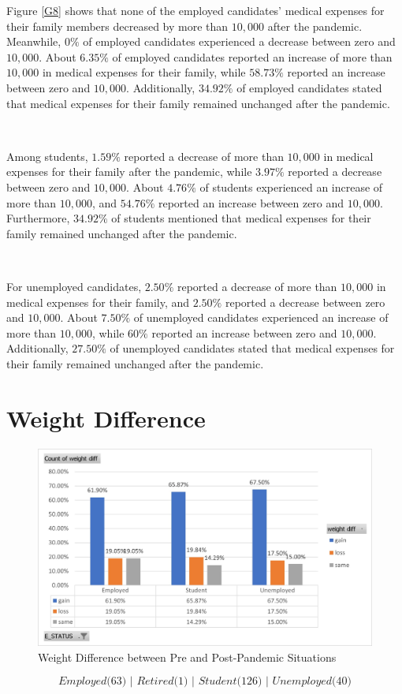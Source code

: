 Figure \ref{G8} shows that none of the employed candidates' medical expenses for their family members decreased by more than $10,000$ after the pandemic. Meanwhile, $0\%$ of employed candidates experienced a decrease between zero and $10,000$. About $6.35\%$ of employed candidates reported an increase of more than $10,000$ in medical expenses for their family, while $58.73\%$ reported an increase between zero and $10,000$. Additionally, $34.92\%$ of employed candidates stated that medical expenses for their family remained unchanged after the pandemic.

\

Among students, $1.59\%$ reported a decrease of more than $10,000$ in medical expenses for their family after the pandemic, while $3.97\%$ reported a decrease between zero and $10,000$. About $4.76\%$ of students experienced an increase of more than $10,000$, and $54.76\%$ reported an increase between zero and $10,000$. Furthermore, $34.92\%$ of students mentioned that medical expenses for their family remained unchanged after the pandemic.

\

For unemployed candidates, $2.50\%$ reported a decrease of more than $10,000$ in medical expenses for their family, and $2.50\%$ reported a decrease between zero and $10,000$. About $7.50\%$ of unemployed candidates experienced an increase of more than $10,000$, while $60\%$ reported an increase between zero and $10,000$. Additionally, $27.50\%$ of unemployed candidates stated that medical expenses for their family remained unchanged after the pandemic.
\newpage 

\section{Weight Difference}

\begin{figure}[h!]
	\centering
	\includegraphics[width=0.9\linewidth]{IMAGES/Image 9.jpg}
	\caption{Weight Difference between Pre and Post-Pandemic Situations}
	\label{G9}
\end{figure}
$$\textit{Employed($63$) | Retired($1$) | Student($126$) | Unemployed($40$)}$$

